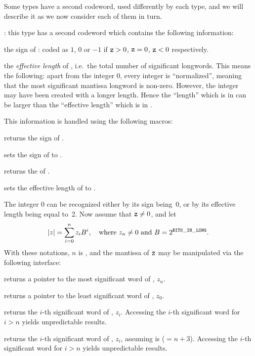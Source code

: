 Some types have a second codeword, used differently by each type, and
we will describe it as we now consider each of them in turn.

: this type has
a second codeword  which contains the following information:

the sign of : coded as $1$, $0$ or $-1$ if ${\tt z} > 0$, ${\tt z} = 0$,
${\tt z} < 0$ respectively.

the \emph{effective length} of , i.e.~the total number of significant
longwords. This means the following: apart from the integer 0, every integer
is ``normalized'', meaning that the most significant mantissa longword is
non-zero. However, the integer may have been created with a longer length.
Hence the ``length'' which is in  can be larger than the
``effective length'' which is in .

\noindent This information is handled using the following macros:

 returns the sign of .

 sets the sign of  to .

 returns the  of .

 sets the effective length
of  to .

The integer 0 can be recognized either by its sign being~0, or by its
effective length being equal to~2. Now assume that ${\tt z} \ne 0$, and let
$$ |z| = \sum_{i = 0}^n z_i B^i,
  \quad{\rm where}~z_n\ne 0~{\rm and}~B = 2^{{\tt BITS\_IN\_LONG}}.
$$
With these notations, $n$ is , and the mantissa of
${\tt z}$ may be manipulated via the following interface:

 returns a pointer to the most significant word of
, $z_n$.

 returns a pointer to the least significant word of
, $z_0$.

 returns the $i$-th significant word of
, $z_i$. Accessing the $i$-th significant word for $i > n$
yields unpredictable results.

 returns the $i$-th significant
word of , $z_i$, assuming  is  ($= n + 3$).
Accessing the $i$-th significant word for $i > n$ yields unpredictable
results.

